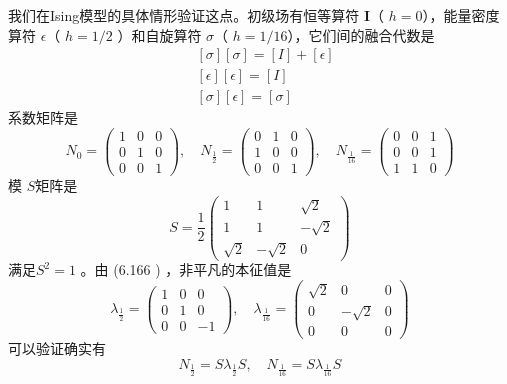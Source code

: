 我们在Ising模型的具体情形验证这点。初级场有恒等算符 $\boldsymbol{I} $（ $h=0 $），能量密度算符 $\epsilon $（ $h=1/2$ ）和自旋算符 $\sigma $（ $h=1/16 $），它们间的融合代数是
\begin{align} &{[\sigma][\sigma]=[I]+[\epsilon]} \\ &{[\epsilon][\epsilon]=[I]} \\ &{[\sigma][\epsilon]=[\sigma]} \end{align}
系数矩阵是
\begin{equation}
	N_{0}=\left(\begin{array}{ccc} 1 & 0 & 0 \\ 0 & 1 & 0 \\ 0 & 0 & 1 \end{array}\right), \quad N_{\frac{1}{2}}=\left(\begin{array}{lll} 0 & 1 & 0 \\ 1 & 0 & 0 \\ 0 & 0 & 1 \end{array}\right), \quad N_{\frac{1}{16}}=\left(\begin{array}{ccc} 0 & 0 & 1 \\ 0 & 0 & 1 \\ 1 & 1 & 0 \end{array}\right)
\end{equation} 
模 $S $矩阵是
\begin{equation}
	S=\frac{1}{2}\left(\begin{array}{ccc} 1 & 1 & \sqrt{2} \\ 1 & 1 & -\sqrt{2} \\ \sqrt{2} & -\sqrt{2} & 0 \end{array}\right)
\end{equation}
满足$ S^2=1$ 。由 (6.166 ) ，非平凡的本征值是
\begin{equation}
	\lambda_{\frac{1}{2}}=\left(\begin{array}{ccc} 1 & 0 & 0 \\ 0 & 1 & 0 \\ 0 & 0 & -1 \end{array}\right), \quad \lambda_{\frac{1}{16}}=\left(\begin{array}{ccc} \sqrt{2} & 0 & 0 \\ 0 & -\sqrt{2} & 0 \\ 0 & 0 & 0 \end{array}\right)
\end{equation} 
可以验证确实有
$$
N_{\frac{1}{2}}=S \lambda_{\frac{1}{2}} S, \quad N_{\frac{1}{16}}=S \lambda_{\frac{1}{16}} S
$$


